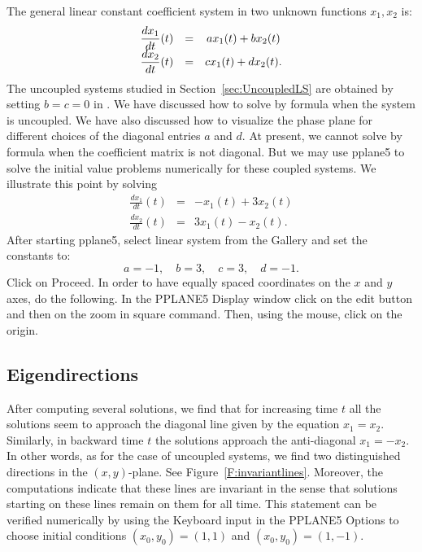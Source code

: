 The general linear constant coefficient system in two unknown functions 
$x_1,x_2$ is:
\renewcommand{\arraystretch}{1.8}
\begin{equation}\label{lin3}
\begin{array}{ccc}
\displaystyle \frac{dx_1}{dt}(t) & = & ax_1(t) + bx_2(t) \\
\displaystyle \frac{dx_2}{dt}(t) & = & cx_1(t) + dx_2(t).
\end{array}
\end{equation}
\renewcommand{\arraystretch}{1.0}%
The uncoupled systems studied in Section~\ref{sec:UncoupledLS} are obtained 
by setting $b=c=0$ in .  We have discussed how to solve  
by formula  when the system is uncoupled.  We have also 
discussed how to visualize the phase plane for different choices of the 
diagonal entries $a$ and $d$.  At present, we cannot
solve  by formula when the coefficient matrix is not diagonal.
But we may use {\sf pplane5} to solve the initial value problems numerically 
for these coupled systems.  We illustrate this point by solving
\begin{eqnarray*}
\frac{dx_1}{dt}(t) & = &  -x_1(t) + 3x_2(t) \\
\frac{dx_2}{dt}(t) & = &  3x_1(t) - x_2(t).
\end{eqnarray*}
After starting {\sf pplane5}, select {\sf linear system} from the
{\sf Gallery} and set the constants to:
\[
	a = -1,\quad b = 3,\quad c = 3, \quad d = -1.
\]
Click on {\sf Proceed}.  In order to have equally spaced coordinates on
the $x$ and $y$ axes, do the following.   In the {\sf PPLANE5 Display} 
window click on the {\sf edit} button and then on the {\sf zoom in square} 
command.  Then, using the mouse, click on the origin.

\subsection*{Eigendirections}

After computing several solutions, we find that for increasing
time $t$ all the solutions seem to approach the diagonal line
given by the equation $x_1=x_2$. Similarly, in backward time $t$
the solutions approach the anti-diagonal $x_1=-x_2$.  In other
words, as for the case of uncoupled systems, we find two
distinguished directions in the $(x,y)$-plane.  See
Figure~\ref{F:invariantlines}.  Moreover, the computations
indicate that these lines are invariant in the sense that
solutions starting on these lines remain on them for all time.
This statement can be verified numerically by using the {\sf
Keyboard input} in the {\sf PPLANE5 Options} to choose initial
conditions $(x_0,y_0)=(1,1)$ and $(x_0,y_0)=(1,-1)$.

